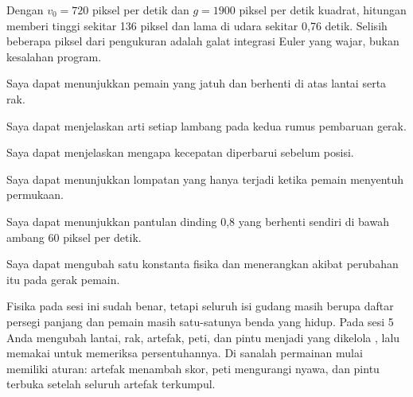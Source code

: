 Dengan $v_0 = 720$ piksel per detik dan $g = 1900$ piksel per detik kuadrat,
hitungan memberi tinggi sekitar 136 piksel dan lama di udara sekitar 0,76
detik. Selisih beberapa piksel dari pengukuran adalah galat integrasi Euler
yang wajar, bukan kesalahan program.


\begin{checklistbox}
\begin{checklist}
  \item Saya dapat menunjukkan pemain yang jatuh dan berhenti di atas lantai
        serta rak.
  \item Saya dapat menjelaskan arti setiap lambang pada kedua rumus pembaruan
        gerak.
  \item Saya dapat menjelaskan mengapa kecepatan diperbarui sebelum posisi.
  \item Saya dapat menunjukkan lompatan yang hanya terjadi ketika pemain
        menyentuh permukaan.
  \item Saya dapat menunjukkan pantulan dinding 0,8 yang berhenti sendiri di
        bawah ambang 60 piksel per detik.
  \item Saya dapat mengubah satu konstanta fisika dan menerangkan akibat
        perubahan itu pada gerak pemain.
\end{checklist}
\end{checklistbox}


Fisika pada sesi ini sudah benar, tetapi seluruh isi gudang masih berupa
daftar persegi panjang dan pemain masih satu-satunya benda yang hidup. Pada
sesi 5 Anda mengubah lantai, rak, artefak, peti, dan pintu menjadi
 yang dikelola , lalu memakai 
untuk memeriksa persentuhannya. Di sanalah permainan mulai memiliki aturan:
artefak menambah skor, peti mengurangi nyawa, dan pintu terbuka setelah
seluruh artefak terkumpul.
